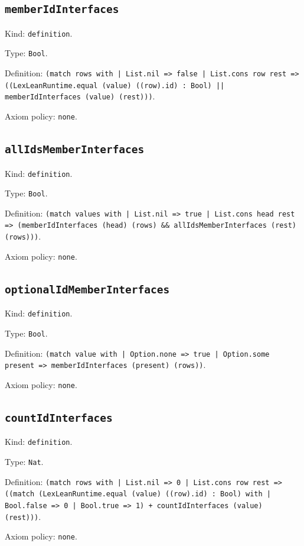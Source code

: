 \documentclass[11pt]{article}
\begin{document}
\subsection*{\texttt{memberIdInterfaces}}
\noindent Kind: \texttt{definition}.\par
\noindent Type: \texttt{Bool}.\par
\noindent Definition: \texttt{(match rows with | List.nil => false | List.cons row rest => ((LexLeanRuntime.equal (value) ((row).id) : Bool) || memberIdInterfaces (value) (rest)))}.\par
\noindent Axiom policy: \texttt{none}.\par
\subsection*{\texttt{allIdsMemberInterfaces}}
\noindent Kind: \texttt{definition}.\par
\noindent Type: \texttt{Bool}.\par
\noindent Definition: \texttt{(match values with | List.nil => true | List.cons head rest => (memberIdInterfaces (head) (rows) \&\& allIdsMemberInterfaces (rest) (rows)))}.\par
\noindent Axiom policy: \texttt{none}.\par
\subsection*{\texttt{optionalIdMemberInterfaces}}
\noindent Kind: \texttt{definition}.\par
\noindent Type: \texttt{Bool}.\par
\noindent Definition: \texttt{(match value with | Option.none => true | Option.some present => memberIdInterfaces (present) (rows))}.\par
\noindent Axiom policy: \texttt{none}.\par
\subsection*{\texttt{countIdInterfaces}}
\noindent Kind: \texttt{definition}.\par
\noindent Type: \texttt{Nat}.\par
\noindent Definition: \texttt{(match rows with | List.nil => 0 | List.cons row rest => ((match (LexLeanRuntime.equal (value) ((row).id) : Bool) with | Bool.false => 0 | Bool.true => 1) + countIdInterfaces (value) (rest)))}.\par
\noindent Axiom policy: \texttt{none}.\par
\end{document}

